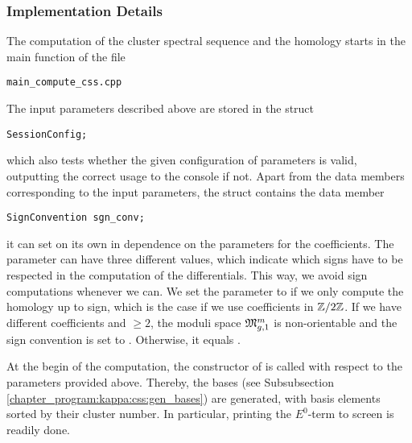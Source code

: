 \subsubsection{Implementation Details}
\label{chapter_program:kappa:compute_css:implementation}

The computation of the cluster spectral sequence and the homology starts in the main function of the file 
\begin{lstlisting}
main_compute_css.cpp
\end{lstlisting}
The input parameters described above are stored in the struct
\begin{lstlisting}
SessionConfig;
\end{lstlisting}
which also tests whether the given configuration of parameters is valid, 
outputting the correct usage to the console if not.
Apart from the data members corresponding to the input parameters, 
the struct  contains the data member
\begin{lstlisting}
SignConvention sgn_conv;
\end{lstlisting}
it can set on its own in dependence on the parameters for the coefficients.
The  parameter can have three different values, 
which indicate which signs have to be respected in the computation of the differentials. 
This way, we avoid sign computations whenever we can.
We set the parameter to  if we only compute the homology up to sign, 
which is the case if we use coefficients in $\Z/2\Z$. 
If we have different coefficients and  $\geq 2$, the moduli space $\Modspc[1]$ is non-orientable and the sign convention is set to . 
Otherwise, it equals . 

At the begin of the computation, the constructor of  is called with respect to the parameters provided above.
Thereby, the bases (see Subsubsection \ref{chapter_program:kappa:css:gen_bases}) are generated, with basis elements sorted by their cluster number.
In particular, printing the $E^0$-term to screen is readily done.

